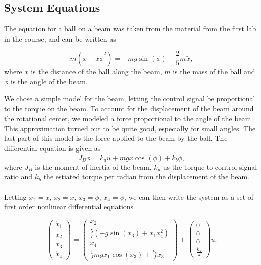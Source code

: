 \subsection{System Equations}


The equation for a ball on a beam was taken from the material from the first lab in the course, and can be written as

\begin{equation}
m(\ddot{x}-x\dot{\phi}^{2})=-mg\sin(\phi)-\frac{2}{5}m\ddot{x},
\end{equation}
where $x$ is the distance of the ball along the beam, $m$ is the mass of the ball and $\phi$ is the angle of the beam.

We chose a simple model for the beam, letting the control signal be proportional to the torque on the beam.
To account for the displacement of the beam around the rotational center, we modeled a force proportional to the angle of the beam.
This approximation turned out to be quite good, especially for small angles.
The last part of this model is the force applied to the beam by the ball.
The differential equation is given as
\begin{equation}
J_{B}\ddot{\phi}=k_{u}u+mgx\cos(\phi)+k_b\phi,
\end{equation}
where $J_{B}$ is the moment of inertia of the beam, $k_u$ us the torque to control signal ratio and $k_b$ the estiated torque per radian from the displacement of the beam.\\
\\
Letting $x_{1}=x,\, x_{2}=\dot{x},\, x_{3}=\phi,\, x_{4}=\dot{\phi}$,
we can then write the system as a set of first order nonlinear differential equations

%
%
%
%

\[
\begin{pmatrix}\dot{x}_{1}\\
\dot{x}_{2}\\
\dot{x}_{3}\\
\dot{x}_{4}
\end{pmatrix}=\begin{pmatrix}x_{2}\\
\frac{5}{7}\left(-g\sin(x_{3})+x_{1}x_{4}^{2}\right)\\
x_{4}\\
\frac{1}{J}mgx_{1}\cos(x_3)+\frac{k_b}{J}x_3
\end{pmatrix}+\begin{pmatrix}0\\
0\\
0\\
\frac{k_{u}}{J}
\end{pmatrix}u.
\]

